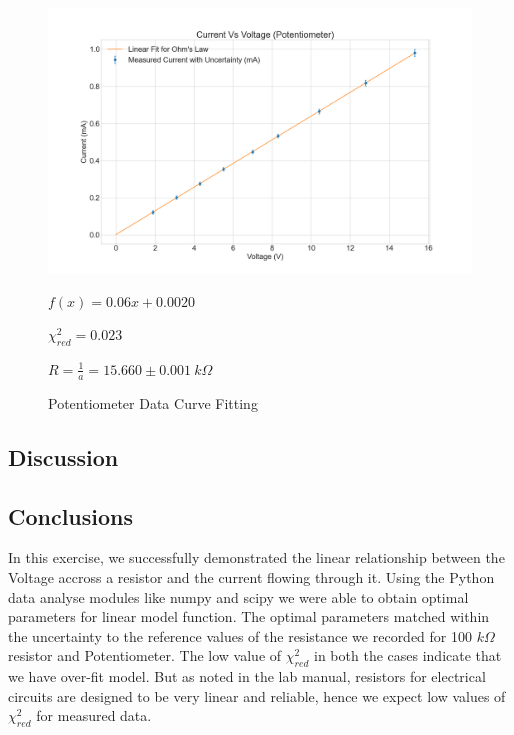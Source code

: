 \documentclass[letterpaper,12pt]{article}
\begin{document}
\begin{figure}[H]
  \centering
  \includegraphics[width=0.95\linewidth]{../Exercise1/lab_1_ex_1_plot_potentiometer.png}   
  \begin{center}
    $f(x) = 0.06 x + 0.0020$
    
    $\chi^2_{red} = 0.023$

    $R = \frac{1}{a} = 15.660 \pm 0.001 \ k\Omega$
  \end{center}  
  \caption{Potentiometer Data Curve Fitting}
  \label{potentiometer-curve-fit}
\end{figure}

\subsection{Discussion}

\subsection{Conclusions}

In this exercise, we successfully demonstrated the linear relationship between the Voltage accross a 
resistor and  the current flowing through it. Using the Python data analyse modules like numpy and scipy we 
were able to obtain optimal parameters for linear model function. The optimal parameters matched within
the uncertainty to the reference values of the resistance we recorded for 100 $k\Omega$ resistor and
Potentiometer. The low value of $\chi_{red}^2$ in both the cases
 indicate that we have over-fit model. But as noted in the lab manual\cite{lab-manual-ex1}, resistors
 for electrical circuits are designed to be very linear and reliable, hence we expect low values of
 $\chi_{red}^2$ for measured data.
\end{document}
